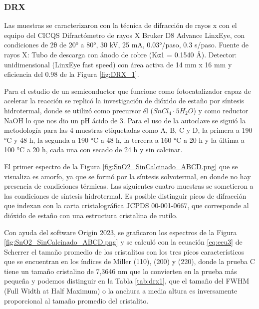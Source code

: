 \documentclass[12pt]{article}
\begin{document}
\subsubsection{DRX}    
Las muestras se caracterizaron con la técnica de difracción de rayos x con el equipo del CICQS Difractómetro de rayos X Bruker D8 Advance LinxEye, con condiciones de 2θ de 20° a 80°, 30 kV, 25 mA, 0.03°/paso, 0.3 s/paso. Fuente de rayos X: Tubo de descarga con ánodo de cobre (Kα1 = 0.1540 Å). Detector: unidimensional (LinxEye fast speed) con área activa de 14 mm x 16 mm y eficiencia del 0.98 de la Figura \ref{fig:DRX_1}.\vspace{1em} %

Para el estudio de un semiconductor que funcione como fotocatalizador capaz de acelerar la reacción  se replicó la investigación \cite{IEEEreferencias:Ref36} de dióxido de estaño por síntesis hidrotermal, donde se utilizó como precursor él ($\displaystyle SnCl_{4} \cdotp 5H_{2} O$)  y como reductor NaOH lo que nos dio un pH ácido de 3. Para el uso de la autoclave se siguió la metodología para las 4 muestras etiquetadas como A, B, C y D, la primera a 190 °C y 48 h, la segunda a 190 °C a 48 h, la tercera a 160 °C a 20 h y la última a 100 °C a 20 h, cada una con secado de 24 h y sin calcinar.\vspace{1em} %

El  primer espectro de la Figura \ref{fig:SnO2_SinCalcinado_ABCD.png} que se visualiza es amorfo, ya que se formó por la síntesis solvotermal, en donde no hay presencia de condiciones térmicas. Las siguientes cuatro muestras se sometieron a las condiciones de síntesis hidrotermal. Es posible distinguir picos de difracción que indexan con la carta cristalográfica JCPDS 00-001-0667, que corresponde al dióxido de estaño con una estructura cristalina de rutilo.\vspace{1em} %

Con ayuda del software Origin 2023, se graficaron los espectros de la Figura \ref{fig:SnO2_SinCalcinado_ABCD.png} y se calculó con la ecuación \ref{eq:ecu3} de Scherrer el tamaño promedio de los cristalitos con los tres picos característicos que se encuentran en los índices de Miller (110), (200) y (220), donde la prueba C tiene un tamaño cristalino de 7,3646 nm que lo convierten en la prueba más pequeña y podemos distinguir en la Tabla \ref{tab:drx1}, que el tamaño del FWHM (Full Width at Half Maximum) o la anchura a media altura es inversamente proporcional al tamaño promedio del cristalito.\vspace{1em} %
\end{document}
